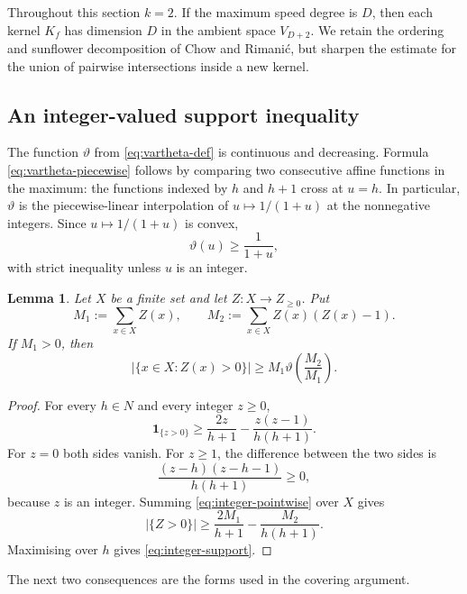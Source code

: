 \documentclass[11pt,reqno]{amsart}
\numberwithin{equation}{section}
\newtheorem{lemma}[lemma]{Lemma}
\theoremstyle{definition}
\theoremstyle{remark}
\newcommand{\one}{\mathbf 1}
\newcommand{\abs}[1]{\lvert#1\rvert}
\newcommand{\set}[1]{\{#1\}}
\def\mathbb#1{#1}%
\begin{document}
Throughout this section $k=2$.  If the maximum speed degree is $D$, then each kernel $K_f$ has dimension $D$ in the ambient space $V_{D+2}$.  We retain the ordering and sunflower decomposition of Chow and Rimani\'c, but sharpen the estimate for the union of pairwise intersections inside a new kernel.

\subsection{An integer-valued support inequality}

The function $\vartheta$ from \eqref{eq:vartheta-def} is continuous and decreasing.  Formula \eqref{eq:vartheta-piecewise} follows by comparing two consecutive affine functions in the maximum: the functions indexed by $h$ and $h+1$ cross at $u=h$.  In particular, $\vartheta$ is the piecewise-linear interpolation of $u\mapsto1/(1+u)$ at the nonnegative integers.  Since $u\mapsto1/(1+u)$ is convex,
\begin{equation}\label{eq:vartheta-CS-comparison}
 \vartheta(u)\ge\frac1{1+u},
\end{equation}
with strict inequality unless $u$ is an integer.

\begin{lemma}\label{lem:integer-support}
Let $X$ be a finite set and let $Z:X\to\mathbb Z_{\ge0}$.  Put
\[
 M_1:=\sum_{x\in X}Z(x),
 \qquad
 M_2:=\sum_{x\in X}Z(x)(Z(x)-1).
\]
If $M_1>0$, then
\begin{equation}\label{eq:integer-support}
 \abs{\set{x\in X:Z(x)>0}}
 \ge M_1\vartheta\left(\frac{M_2}{M_1}\right).
\end{equation}
\end{lemma}

\begin{proof}
For every $h\in\mathbb N$ and every integer $z\ge0$,
\begin{equation}\label{eq:integer-pointwise}
 \one_{\{z>0\}}
 \ge
 \frac{2z}{h+1}
 -\frac{z(z-1)}{h(h+1)}.
\end{equation}
For $z=0$ both sides vanish.  For $z\ge1$, the difference between the two sides is
\[
 \frac{(z-h)(z-h-1)}{h(h+1)}\ge0,
\]
because $z$ is an integer.  Summing \eqref{eq:integer-pointwise} over $X$ gives
\[
 \abs{\set{Z>0}}
 \ge
 \frac{2M_1}{h+1}
 -\frac{M_2}{h(h+1)}.
\]
Maximising over $h$ gives \eqref{eq:integer-support}.
\end{proof}

The next two consequences are the forms used in the covering argument.
\end{document}
